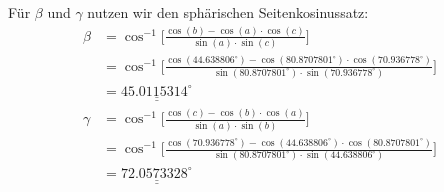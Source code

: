 Für $\beta$ und $\gamma$ nutzen wir den sphärischen Seitenkosinussatz:
\begin{align*}
	\beta &= \cos^{-1}  \bigg[\frac{\cos(b)-\cos(a) \cdot \cos(c)}{\sin(a) \cdot \sin(c)}\bigg] \\
	&= \cos^{-1}  \bigg[\frac{\cos(44.638806^\circ)-\cos(80.8707801^\circ) \cdot \cos(70.936778^\circ)}{\sin(80.8707801^\circ) \cdot \sin(70.936778^\circ)}\bigg] \\
	&= \underline{\underline{45.0115314^\circ}} 
\\
\gamma &=  \cos^{-1}  \bigg[\frac{\cos(c)-\cos(b) \cdot \cos(a)}{\sin(a) \cdot \sin(b)}\bigg] \\
	&=  \cos^{-1}  \bigg[\frac{\cos(70.936778^\circ)-\cos(44.638806^\circ) \cdot \cos(80.8707801^\circ)}{\sin(80.8707801^\circ) \cdot \sin(44.638806^\circ)}\bigg] \\
	&=\underline{\underline{72.0573328^\circ}} 
\end{align*}



